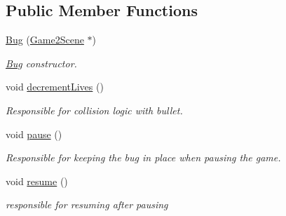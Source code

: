 \subsection*{Public Member Functions}
\begin{DoxyCompactItemize}
\item 
\hypertarget{classBug_ab8661834cbf8ea0d59bfcce05f8c19ac}{\hyperlink{classBug_ab8661834cbf8ea0d59bfcce05f8c19ac}{Bug} (\hyperlink{classGame2Scene}{Game2\-Scene} $\ast$)}\label{classBug_ab8661834cbf8ea0d59bfcce05f8c19ac}

\begin{DoxyCompactList}\small\item\em \hyperlink{classBug}{Bug} constructor. \end{DoxyCompactList}\item 
\hypertarget{classBug_a66fa2b39d8200535383e0feff494cd5c}{void \hyperlink{classBug_a66fa2b39d8200535383e0feff494cd5c}{decrement\-Lives} ()}\label{classBug_a66fa2b39d8200535383e0feff494cd5c}

\begin{DoxyCompactList}\small\item\em Responsible for collision logic with bullet. \end{DoxyCompactList}\item 
\hypertarget{classBug_ae009fdbc7055d30044e6b996fa89c6fc}{void \hyperlink{classBug_ae009fdbc7055d30044e6b996fa89c6fc}{pause} ()}\label{classBug_ae009fdbc7055d30044e6b996fa89c6fc}

\begin{DoxyCompactList}\small\item\em Responsible for keeping the bug in place when pausing the game. \end{DoxyCompactList}\item 
\hypertarget{classBug_ae634fa739fc20b7891fd0327fc78deae}{void \hyperlink{classBug_ae634fa739fc20b7891fd0327fc78deae}{resume} ()}\label{classBug_ae634fa739fc20b7891fd0327fc78deae}

\begin{DoxyCompactList}\small\item\em responsible for resuming after pausing \end{DoxyCompactList}\end{DoxyCompactItemize}
